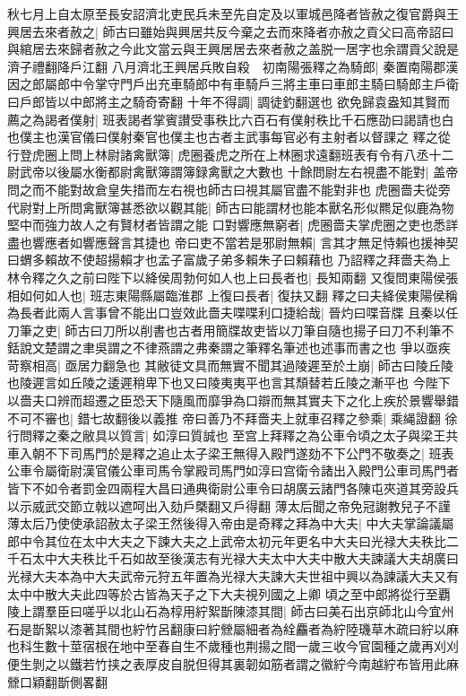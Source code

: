 秋七月上自太原至長安詔濟北吏民兵未至先自定及以軍城邑降者皆赦之復官爵與王興居去來者赦之|{
	師古曰雖始與興居共反今棄之去而來降者亦赦之貢父曰高帝詔曰與綰居去來歸者赦之今此文當云與王興居居去來者赦之盖脱一居字也余謂貢父說是濟子禮翻降戶江翻}
八月濟北王興居兵敗自殺　初南陽張釋之為騎郎|{
	秦置南陽郡漢因之郎屬郎中令掌守門戶出充車騎郎中有車騎戶三將主車曰車郎主騎曰騎郎主戶衛曰戶郎皆以中郎將主之騎奇寄翻}
十年不得調|{
	調徒釣翻選也}
欲免歸袁盎知其賢而薦之為謁者僕射|{
	班表謁者掌賓讃受事秩比六百石有僕射秩比千石應劭曰謁請也白也僕主也漢官儀曰僕射秦官也僕主也古者主武事每官必有主射者以督課之}
釋之從行登虎圈上問上林尉諸禽獸簿|{
	虎圈養虎之所在上林圈求遠翻班表有令有八丞十二尉武帝以後屬水衡都尉禽獸簿謂簿録禽獸之大數也}
十餘問尉左右視盡不能對|{
	盖帝問之而不能對故倉皇失措而左右視也師古曰視其屬官盡不能對非也}
虎圈嗇夫從旁代尉對上所問禽獸簿甚悉欲以觀其能|{
	師古曰能謂材也能本獸名形似羆足似鹿為物堅中而強力故人之有賢材者皆謂之能}
口對響應無窮者|{
	虎圈嗇夫掌虎圈之吏也悉詳盡也響應者如響應聲言其捷也}
帝曰吏不當若是邪尉無賴|{
	言其才無足恃賴也援神契曰蝟多賴故不使超揚賴才也孟子富歲子弟多賴朱子曰賴藉也}
乃詔釋之拜嗇夫為上林令釋之久之前曰陛下以絳侯周勃何如人也上曰長者也|{
	長知兩翻}
又復問東陽侯張相如何如人也|{
	班志東陽縣屬臨淮郡}
上復曰長者|{
	復扶又翻}
釋之曰夫絳侯東陽侯稱為長者此兩人言事曾不能出口豈效此嗇夫喋喋利口捷給哉|{
	晉灼曰喋音牒}
且秦以任刀筆之吏|{
	師古曰刀所以削書也古者用簡牒故吏皆以刀筆自隨也揚子曰刀不利筆不銛說文楚謂之聿吳謂之不律燕謂之弗秦謂之筆釋名筆述也述事而書之也}
爭以亟疾苛察相高|{
	亟居力翻急也}
其敝徒文具而無實不聞其過陵遲至於土崩|{
	師古曰陵丘陵也陵遲言如丘陵之逶遲稍卑下也又曰陵夷夷平也言其頹替若丘陵之漸平也}
今陛下以嗇夫口辨而超遷之臣恐天下隨風而靡爭為口辯而無其實夫下之化上疾於景響舉錯不可不審也|{
	錯七故翻後以義推}
帝曰善乃不拜嗇夫上就車召釋之參乘|{
	乘䋲證翻}
徐行問釋之秦之敝具以質言|{
	如淳曰質誠也}
至宫上拜釋之為公車令頃之太子與梁王共車入朝不下司馬門於是釋之追止太子梁王無得入殿門遂劾不下公門不敬奏之|{
	班表公車令屬衛尉漢官儀公車司馬令掌殿司馬門如淳曰宫衛令諸出入殿門公車司馬門者皆下不如令者罰金四兩程大昌曰通典衛尉公車令曰胡廣云諸門各陳屯夾道其旁設兵以示威武交節立戟以遮呵出入劾戶槩翻又戶得翻}
薄太后聞之帝免冠謝教兒子不謹薄太后乃使使承詔赦太子梁王然後得入帝由是奇釋之拜為中大夫|{
	中大夫掌論議屬郎中令其位在太中大夫之下諫大夫之上武帝太初元年更名中大夫曰光禄大夫秩比二千石太中大夫秩比千石如故至後漢志有光禄大夫太中大夫中散大夫諫議大夫胡廣曰光禄大夫本為中大夫武帝元狩五年置為光禄大夫諫大夫世祖中興以為諫議大夫又有太中中散大夫此四等於古皆為天子之下大夫視列國之上卿}
頃之至中郎將從行至覇陵上謂羣臣曰嗟乎以北山石為椁用紵絮斮陳漆其間|{
	師古曰美石出京師北山今宜州石是斮絮以漆著其間也紵竹呂翻康曰紵檾屬細者為絟麤者為紵陸璣草木疏曰紵以麻也科生數十莖宿根在地中至春自生不歲種也荆揚之間一歲三收今官園種之歲再刈刈便生剝之以鐵若竹挟之表厚皮自脱但得其裏韌如筋者謂之徽紵今南越紵布皆用此麻檾口穎翻斮側畧翻}
